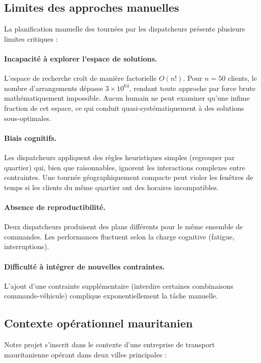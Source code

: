 \documentclass[12pt,a4paper]{report}
\begin{document}
\subsection{Limites des approches manuelles}

La planification manuelle des tournées par les dispatcheurs présente plusieurs limites critiques :

\paragraph{Incapacité à explorer l'espace de solutions.} L'espace de recherche croît de manière factorielle $O(n!)$. Pour $n = 50$ clients, le nombre d'arrangements dépasse $3 \times 10^{64}$, rendant toute approche par force brute mathématiquement impossible. Aucun humain ne peut examiner qu'une infime fraction de cet espace, ce qui conduit quasi-systématiquement à des solutions sous-optimales.

\paragraph{Biais cognitifs.} Les dispatcheurs appliquent des règles heuristiques simples (regrouper par quartier) qui, bien que raisonnables, ignorent les interactions complexes entre contraintes. Une tournée géographiquement compacte peut violer les fenêtres de temps si les clients du même quartier ont des horaires incompatibles.

\paragraph{Absence de reproductibilité.} Deux dispatcheurs produisent des plans différents pour le même ensemble de commandes. Les performances fluctuent selon la charge cognitive (fatigue, interruptions).

\paragraph{Difficulté à intégrer de nouvelles contraintes.} L'ajout d'une contrainte supplémentaire (interdire certaines combinaisons commande-véhicule) complique exponentiellement la tâche manuelle.

\subsection{Contexte opérationnel mauritanien}

Notre projet s'inscrit dans le contexte d'une entreprise de transport mauritanienne opérant dans deux villes principales :
\end{document}
